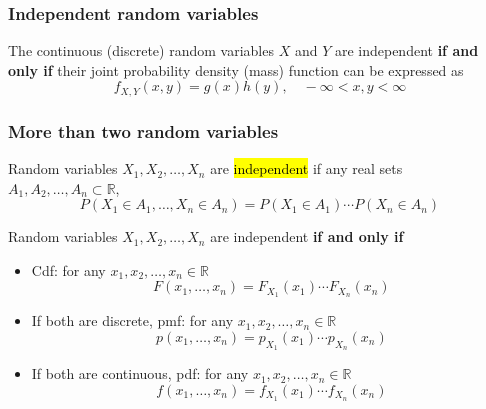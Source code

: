 \documentclass[slidestop,compress,mathserif]{beamer}
\begin{document}
\begin{frame}\frametitle{Independent random variables}

The continuous (discrete) random variables $X$ and $Y$ are independent {\bf if and only if}
their joint probability density (mass) function can be expressed as
\[f_{X, Y}(x, y) = g(x) h(y), \quad -\infty < x, y < \infty \]

\vfill

\end{frame}


\begin{frame}\frametitle{More than two random variables}
\begin{dinglist}{\DingListSymbolA}
\item Random variables $X_1, X_2, \ldots, X_n$ are \hl{independent} if any real sets $A_1, A_2, \ldots, A_n \subset \mathbb{R}$,
\[P(X_1 \in A_1,  \ldots, X_n \in A_n) = P(X_1 \in A_1) \cdots P(X_n \in A_n)\]
\end{dinglist}

\pause Random variables $X_1, X_2, \ldots, X_n$ are independent {\bf if and only if}
\begin{itemize}
\item Cdf: for any $x_1, x_2, \ldots, x_n \in \mathbb{R}$
\[F(x_1, \ldots, x_n) = F_{X_1}(x_1)\cdots F_{X_n}(x_n)\]
\item \pause If both are discrete, pmf: for any $x_1, x_2, \ldots, x_n \in \mathbb{R}$
\[p(x_1, \ldots, x_n) = p_{X_1}(x_1)\cdots p_{X_n}(x_n)\]
\item \pause If both are continuous, pdf: for any $x_1, x_2, \ldots, x_n \in \mathbb{R}$
\[f(x_1, \ldots, x_n) = f_{X_1}(x_1)\cdots f_{X_n}(x_n)\]

\end{itemize}
\end{frame}
\end{document}
